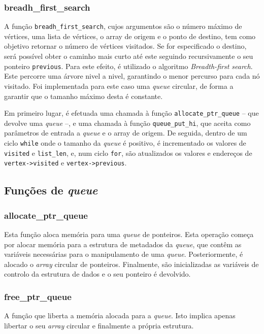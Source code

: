 \documentclass[portuguese,11pt,a4paper,titlepage]{article}
\newcommand{\foreign}[1]{\textit{#1}}
\begin{document}
\subsubsection{breadh\_first\_search}
A função \verb|breadh_first_search|, cujos argumentos são o número máximo de vértices, uma lista de vértices, o array de origem e o ponto de destino, tem como objetivo retornar o número de vértices visitados. Se for especificado o destino, será possível obter o 
caminho mais curto até este seguindo recursivamente o seu ponteiro \verb|previous|. Para
este efeito, é utilizado o algoritmo \textit{Breadth-first search}. Este percorre uma
árvore nivel a nivel, garantindo o menor percurso para cada nó visitado. Foi implementada para este caso
uma \foreign{queue} circular, de forma a garantir que o tamanho máximo desta é constante.

Em primeiro lugar, é efetuada uma chamada à função \verb|allocate_ptr_queue| -- que devolve uma \textit{queue} --, e uma chamada à função \verb|queue_put_hi|, que aceita como parâmetros de entrada a \textit{queue} e o array de origem. De seguida, dentro de um ciclo \verb|while| onde o tamanho da \textit{queue} é positivo, é incrementado os valores de \verb|visited| e \verb|list_len|, e, num ciclo \verb|for|, são atualizados os valores e endereços de \verb|vertex->visited| e \verb|vertex->previous|.

\subsection{Funções de \textit{queue}}
\subsubsection{allocate\_ptr\_queue}
Esta função aloca memória para uma \textit{queue} de ponteiros. Esta operação começa
por alocar memória para a estrutura de metadados da \foreign{queue}, que contêm as
variáveis necessárias para o manipulamento de uma \foreign{queue}. Posteriormente,
é alocado o \foreign{array} circular de ponteiros. Finalmente, são inicializadas
as variáveis de controlo da estrutura de dados e o seu ponteiro é devolvido.

\subsubsection{free\_ptr\_queue}
A função que liberta a memória alocada para a \foreign{queue}. Isto implica apenas
libertar o seu \foreign{array} circular e finalmente a própria estrutura.
\end{document}
